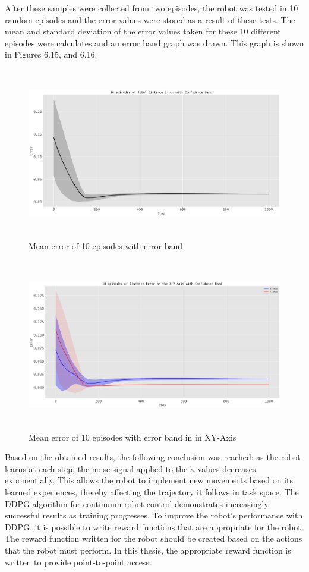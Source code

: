\documentclass[12pt,twoside,a4]{mwbk}
\begin{document}
\noindent After these samples were collected from two episodes, the robot was tested in 10 random episodes and the error values were stored as a result of these tests. The mean and standard deviation of the error values taken for these 10 different episodes were calculates and an error band graph was drawn. This graph is shown in Figures 6.15, and 6.16.
\begin{figure}[h!]
    \centering
    \includegraphics[width=15cm, height=7.5cm]{mean_err_x_y.png}
    \caption{Mean error of 10 episodes with error band}
\end{figure}
\newpage
\begin{figure}[h!]
    \centering
    \includegraphics[width=15cm, height=7.5cm]{mean_err_tot.png}
    \caption{Mean error of 10 episodes with error band in in XY-Axis}
\end{figure}
\noindent Based on the obtained results, the following conclusion was reached: as the robot learns at each step, the noise signal applied to the $\dot{\kappa}$ values decreases exponentially. This allows the robot to implement new movements based on its learned experiences, thereby affecting the trajectory it follows in task space. The DDPG algorithm for continuum robot control demonstrates increasingly successful results as training progresses. To improve the robot's performance with DDPG, it is possible to write reward functions that are appropriate for the robot. The reward function written for the robot should be created based on the actions that the robot must perform. In this thesis, the appropriate reward function is written to provide point-to-point access.
\end{document}
